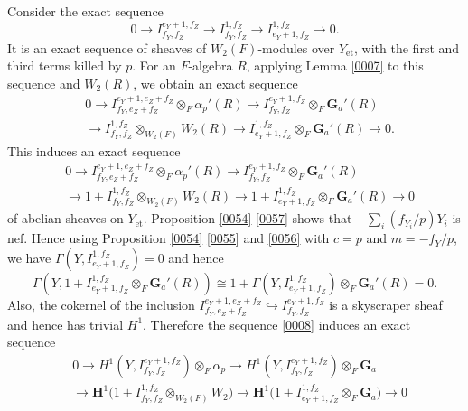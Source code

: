 \documentclass{amsart}
\theoremstyle{remark}
\numberwithin{equation}{section}
\newcommand{\into}{\hookrightarrow}
\newcommand{\tensor}{\mathbin{\otimes}}
\newcommand{\et}{\mathrm{et}}
\newcommand{\Ga}{\mathbf{G}_{a}}
\newcommand{\alg}[1]{\mathbf{#1}}
\begin{document}
Consider the exact sequence
	\[
			0
		\to
			I^{e_{Y} + 1, f_{Z}}_{f_{Y}, f_{Z}}
		\to
			I^{1, f_{Z}}_{f_{Y}, f_{Z}}
		\to
			I^{1, f_{Z}}_{e_{Y} + 1, f_{Z}}
		\to
			0.
	\]
It is an exact sequence of sheaves of $W_{2}(F)$-modules over $Y_{\et}$,
with the first and third terms killed by $p$.
For an $F$-algebra $R$,
applying Lemma \ref{0007} to this sequence and $W_{2}(R)$,
we obtain an exact sequence
	\begin{align*}
		&
				0
			\to
					I^{e_{Y} + 1, e_{Z} + f_{Z}}_{f_{Y}, e_{Z} + f_{Z}}
				\tensor_{F}
					\alpha_{p}'(R)
			\to
					I^{e_{Y} + 1, f_{Z}}_{f_{Y}, f_{Z}}
				\tensor_{F}
					\Ga'(R)
		\\
		&	\to
					I^{1, f_{Z}}_{f_{Y}, f_{Z}}
				\tensor_{W_{2}(F)}
					W_{2}(R)
			\to
					I^{1, f_{Z}}_{e_{Y} + 1, f_{Z}}
				\tensor_{F}
					\Ga'(R)
			\to
				0.
	\end{align*}
This induces an exact sequence
	\begin{equation} \label{0008}
		\begin{aligned}
			&
					0
				\to
						I^{e_{Y} + 1, e_{Z} + f_{Z}}_{f_{Y}, e_{Z} + f_{Z}}
					\tensor_{F}
						\alpha_{p}'(R)
				\to
						I^{e_{Y} + 1, f_{Z}}_{f_{Y}, f_{Z}}
					\tensor_{F}
						\Ga'(R)
			\\
			&	\to
							1
					+
						I^{1, f_{Z}}_{f_{Y}, f_{Z}}
					\tensor_{W_{2}(F)}
						W_{2}(R)
				\to
						1
					+
						I^{1, f_{Z}}_{e_{Y} + 1, f_{Z}}
					\tensor_{F}
						\Ga'(R)
				\to
					0
		\end{aligned}
	\end{equation}
of abelian sheaves on $Y_{\et}$.
Proposition \ref{0054} \eqref{0057} shows that
$- \sum_{i} (f_{Y_{i}} / p) Y_{i}$ is nef.
Hence using Proposition \ref{0054} \eqref{0055} and \eqref{0056}
with $c = p$ and $m = - f_{Y} / p$,
we have $\Gamma(Y, I^{1, f_{Z}}_{e_{Y} + 1, f_{Z}}) = 0$
and hence
	\[
			\Gamma(Y, 1 + I^{1, f_{Z}}_{e_{Y} + 1, f_{Z}} \tensor_{F} \Ga'(R))
		\cong
			1 + \Gamma(Y, I^{1, f_{Z}}_{e_{Y} + 1, f_{Z}}) \tensor_{F} \Ga'(R)
		=
			0.
	\]
Also, the cokernel of the inclusion
	$
			I^{e_{Y} + 1, e_{Z} + f_{Z}}_{f_{Y}, e_{Z} + f_{Z}}
		\into
			I^{e_{Y} + 1, f_{Z}}_{f_{Y}, f_{Z}}
	$
is a skyscraper sheaf
and hence has trivial $H^{1}$.
Therefore the sequence \eqref{0008} induces an exact sequence
	\begin{align*}
		&
				0
			\to
					H^{1}(Y, I^{e_{Y} + 1, f_{Z}}_{f_{Y}, f_{Z}})
				\tensor_{F}
					\alpha_{p}
			\to
					H^{1}(Y, I^{e_{Y} + 1, f_{Z}}_{f_{Y}, f_{Z}})
				\tensor_{F}
					\Ga
		\\
		&	\to
				\alg{H}^{1} \bigl(
						1
					+
						I^{1, f_{Z}}_{f_{Y}, f_{Z}}
					\tensor_{W_{2}(F)}
						W_{2}
				\bigr)
			\to
				\alg{H}^{1} \bigl(
						1
					+
						I^{1, f_{Z}}_{e_{Y} + 1, f_{Z}}
					\tensor_{F}
						\Ga
				\bigr)
			\to
				0
	\end{align*}
\end{document}
